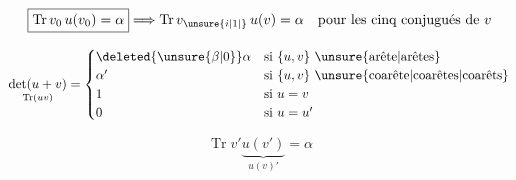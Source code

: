 \[
\boxed{\operatorname{Tr}v_0\,u(v_0)=\alpha}\Longrightarrow
\operatorname{Tr}v_{\unsure{i|1|{}}}\,u(v)=\alpha
\quad\text{pour les cinq conjugués de }v
\]

\[
\underset{\operatorname{Tr}(uv)}{\det(u+v)}=
\begin{cases}
\deleted{\unsure{\beta|0}}\alpha&\text{si }\{u,v\}\ \text{\unsure{arête|arêtes}}\\
\alpha'&\text{si }\{u,v\}\ \text{\unsure{coarête|coarêtes|coarêts}}\\
1&\text{si }u=v\\
0&\text{si }u=u'
\end{cases}
\]

\[
\operatorname{Tr}v'\underbrace{u(v')}_{u(v)'}=\alpha
\]

